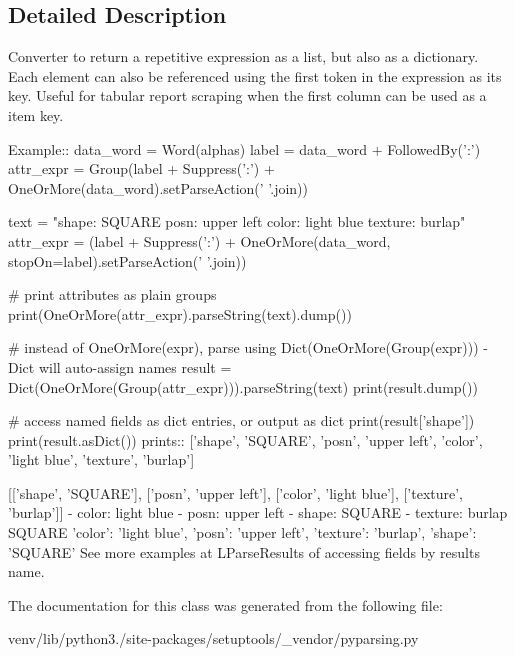 \subsection{Detailed Description}
\begin{DoxyVerb}Converter to return a repetitive expression as a list, but also as a dictionary.
Each element can also be referenced using the first token in the expression as its key.
Useful for tabular report scraping when the first column can be used as a item key.

Example::
    data_word = Word(alphas)
    label = data_word + FollowedBy(':')
    attr_expr = Group(label + Suppress(':') + OneOrMore(data_word).setParseAction(' '.join))

    text = "shape: SQUARE posn: upper left color: light blue texture: burlap"
    attr_expr = (label + Suppress(':') + OneOrMore(data_word, stopOn=label).setParseAction(' '.join))
    
    # print attributes as plain groups
    print(OneOrMore(attr_expr).parseString(text).dump())
    
    # instead of OneOrMore(expr), parse using Dict(OneOrMore(Group(expr))) - Dict will auto-assign names
    result = Dict(OneOrMore(Group(attr_expr))).parseString(text)
    print(result.dump())
    
    # access named fields as dict entries, or output as dict
    print(result['shape'])        
    print(result.asDict())
prints::
    ['shape', 'SQUARE', 'posn', 'upper left', 'color', 'light blue', 'texture', 'burlap']

    [['shape', 'SQUARE'], ['posn', 'upper left'], ['color', 'light blue'], ['texture', 'burlap']]
    - color: light blue
    - posn: upper left
    - shape: SQUARE
    - texture: burlap
    SQUARE
    {'color': 'light blue', 'posn': 'upper left', 'texture': 'burlap', 'shape': 'SQUARE'}
See more examples at L{ParseResults} of accessing fields by results name.
\end{DoxyVerb}
 

The documentation for this class was generated from the following file\+:\begin{DoxyCompactItemize}
\item 
venv/lib/python3./site-\/packages/setuptools/\+\_\+vendor/pyparsing.\+py\end{DoxyCompactItemize}
